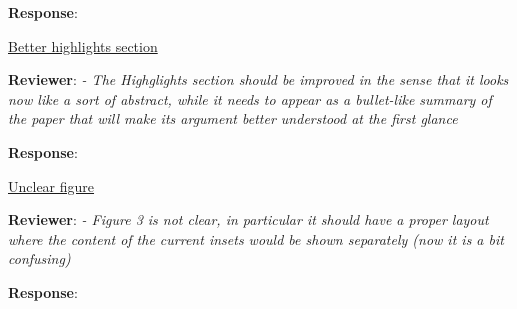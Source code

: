 \documentclass{article}
\begin{document}
\textbf{Response}:

\underline{Better highlights section}

\textbf{Reviewer}: \textit{- The Highglights section should be improved in the sense that it looks now like a sort of abstract, while it needs to appear as a bullet-like summary of the paper that will make its argument better understood at the first glance}

\textbf{Response}:

\underline{Unclear figure}

\textbf{Reviewer}: \textit{- Figure 3 is not clear, in particular it should have a proper layout where the content of the current insets would be shown separately (now it is a bit confusing)}

\textbf{Response}:
\end{document}
